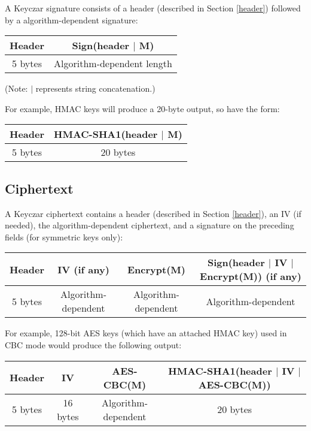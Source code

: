 \documentclass{llncs}
\begin{document}
A Keyczar signature consists of a header (described in Section \ref{header})
followed by a algorithm-dependent signature:

\vspace*{3mm}
\begin{tabular}{| c | c |}
\hline
Header & Sign(header $|$ M) \\
\hline 5 bytes & Algorithm-dependent length \\ \hline
\end{tabular}
\vspace*{3mm}

(Note: $|$ represents string concatenation.)

\vspace*{3mm}

For example, HMAC keys will produce a 20-byte output, so have the form:

\vspace*{3mm}
\begin{tabular}{| c | c |}
\hline
Header & HMAC-SHA1(header $|$ M) \\ \hline
5 bytes & 20 bytes \\ \hline
\end{tabular}
\vspace*{3mm}
\subsection{Ciphertext}

A Keyczar ciphertext contains a header (described in Section \ref{header}), an
IV (if needed), the algorithm-dependent ciphertext, and a signature on the
preceding fields (for symmetric keys only):

\vspace*{3mm}
\begin{tabular}{| c | c | c | c |}
\hline
Header & IV (if any) & Encrypt(M) & Sign(header $|$ IV $|$ Encrypt(M)) (if any) \\ \hline
5 bytes & Algorithm-dependent & Algorithm-dependent & Algorithm-dependent \\
\hline
\end{tabular}
\vspace*{3mm}

For example, 128-bit AES keys (which have an attached HMAC key) used in CBC
mode would produce the following output:

\vspace*{3mm}
\begin{tabular}{| c | c | c | c |}
\hline
Header & IV & AES-CBC(M) & HMAC-SHA1(header $|$ IV $|$ AES-CBC(M)) \\ \hline
5 bytes & 16 bytes & Algorithm-dependent & 20 bytes \\
\hline
\end{tabular}
\vspace*{3mm}
\end{document}
